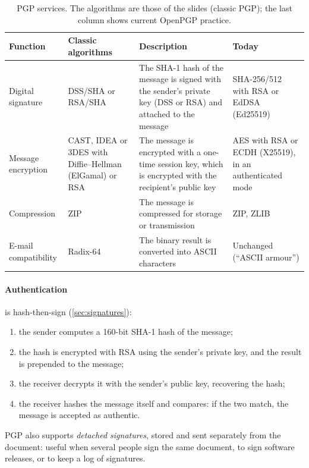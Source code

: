 \begin{table}[H]
\centering
\caption{PGP services. The algorithms are those of the slides (classic PGP); the last column shows current OpenPGP practice.}
\label{tab:pgp-services}
\begin{tabularx}{\textwidth}{@{}l X X X@{}}
\toprule
Function & Classic algorithms & Description & Today \\
\midrule
Digital signature & DSS/SHA or RSA/SHA & The SHA-1 hash of the message is signed with the sender's private key (DSS or RSA) and attached to the message & SHA-256/512 with RSA or EdDSA (Ed25519) \\
Message encryption & CAST, IDEA or 3DES with Diffie--Hellman (ElGamal) or RSA & The message is encrypted with a one-time session key, which is encrypted with the recipient's public key & AES with RSA or ECDH (X25519), in an authenticated mode \\
Compression & ZIP & The message is compressed for storage or transmission & ZIP, ZLIB \\
E-mail compatibility & Radix-64 & The binary result is converted into ASCII characters & Unchanged (\enquote{ASCII armour}) \\
\bottomrule
\end{tabularx}
\end{table}

\paragraph{Authentication} is hash-then-sign (\cref{sec:signatures}):
\begin{enumerate}
    \item the sender computes a 160-bit SHA-1 hash of the message;
    \item the hash is encrypted with RSA using the sender's private key, and the result is prepended to the message;
    \item the receiver decrypts it with the sender's public key, recovering the hash;
    \item the receiver hashes the message itself and compares: if the two match, the message is accepted as authentic.
\end{enumerate}
PGP also supports \emph{detached signatures}, stored and sent separately from the document: useful when several people sign the same document, to sign software releases, or to keep a log of signatures.

